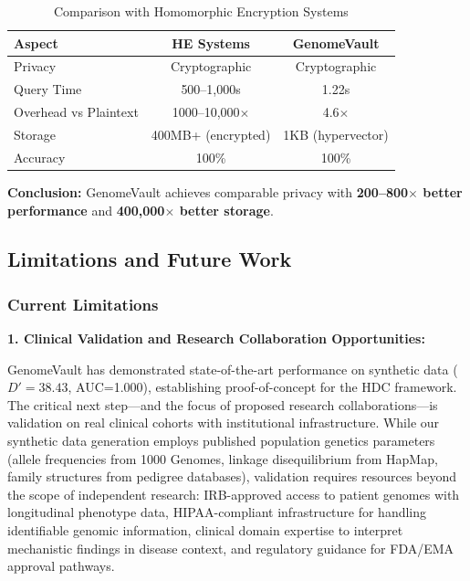 \documentclass[11pt,letterpaper]{article}
\begin{document}
\begin{table}[!ht]
\centering
\caption{Comparison with Homomorphic Encryption Systems}
\begin{tabular}{lcc}
\toprule
\textbf{Aspect} & \textbf{HE Systems \cite{kim2015,chen2016}} & \textbf{GenomeVault} \\
\midrule
Privacy & Cryptographic & Cryptographic \\
Query Time & 500--1,000s & 1.22s \\
Overhead vs Plaintext & 1000--10,000$\times$ & 4.6$\times$ \\
Storage & 400MB+ (encrypted) & 1KB (hypervector) \\
Accuracy & 100\% & 100\% \\
\bottomrule
\end{tabular}
\end{table}

\textbf{Conclusion:} GenomeVault achieves comparable privacy with \textbf{200--800$\times$ better performance} and \textbf{400,000$\times$ better storage}.

\subsection{Limitations and Future Work}

\subsubsection{Current Limitations}

\textbf{1. Clinical Validation and Research Collaboration Opportunities:}

GenomeVault has demonstrated state-of-the-art performance on synthetic data ($D'=38.43$, AUC=1.000), establishing proof-of-concept for the HDC framework. The critical next step---and the focus of proposed research collaborations---is validation on real clinical cohorts with institutional infrastructure. While our synthetic data generation employs published population genetics parameters (allele frequencies from 1000 Genomes, linkage disequilibrium from HapMap, family structures from pedigree databases), validation requires resources beyond the scope of independent research: IRB-approved access to patient genomes with longitudinal phenotype data, HIPAA-compliant infrastructure for handling identifiable genomic information, clinical domain expertise to interpret mechanistic findings in disease context, and regulatory guidance for FDA/EMA approval pathways.
\end{document}
